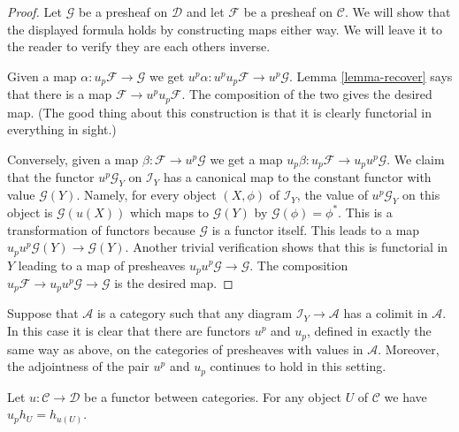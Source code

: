 \begin{proof}
Let $\mathcal{G}$ be a presheaf on $\mathcal{D}$ and let
$\mathcal{F}$ be a presheaf on $\mathcal{C}$.
We will show that the displayed formula holds
by constructing maps either way. We will leave
it to the reader to verify they are each others inverse.

\medskip\noindent
Given a map $\alpha : u_p \mathcal{F} \to \mathcal{G}$
we get $u^p\alpha : u^p u_p \mathcal{F} \to u^p \mathcal{G}$.
Lemma \ref{lemma-recover} says that there is a
map $\mathcal{F} \to u^p u_p \mathcal{F}$. The composition
of the two gives the desired map. (The good thing about this construction
is that it is clearly functorial in everything in sight.)

\medskip\noindent
Conversely, given a map $\beta : \mathcal{F} \to u^p\mathcal{G}$
we get a map $u_p\beta : u_p\mathcal{F} \to u_p u^p\mathcal{G}$.
We claim that the functor $u^p\mathcal{G}_Y$ on $\mathcal{I}_Y$
has a canonical map to the constant functor with value $\mathcal{G}(Y)$.
Namely, for every object $(X, \phi)$ of $\mathcal{I}_Y$,
the value of $u^p\mathcal{G}_Y$ on this object is $\mathcal{G}(u(X))$
which maps to $\mathcal{G}(Y)$ by $\mathcal{G}(\phi) = \phi^* $.
This is a transformation of functors because $\mathcal{G}$ is a functor
itself. This leads to a map $u_p u^p \mathcal{G}(Y) \to \mathcal{G}(Y)$.
Another trivial verification shows that this is functorial in $Y$
leading to a map of presheaves $u_p u^p \mathcal{G} \to \mathcal{G}$.
The composition $u_p\mathcal{F} \to u_p u^p\mathcal{G} \to
\mathcal{G}$ is the desired map.
\end{proof}

\begin{remark}
\label{remark-functoriality-presheaves-values}
Suppose that $\mathcal{A}$ is a category such that
any diagram $\mathcal{I}_Y \to \mathcal{A}$ has a
colimit in $\mathcal{A}$. In this case it is clear
that there are functors $u^p$ and $u_p$, defined in
exactly the same way as above, on the categories
of presheaves with values in $\mathcal{A}$.
Moreover, the adjointness of the pair
$u^p$ and $u_p$ continues to hold in this setting.
\end{remark}

\begin{lemma}
\label{lemma-pullback-representable-presheaf}
Let $u : \mathcal{C} \to \mathcal{D}$ be a functor between categories.
For any object $U$ of $\mathcal{C}$ we have $u_ph_U = h_{u(U)}$.
\end{lemma}

